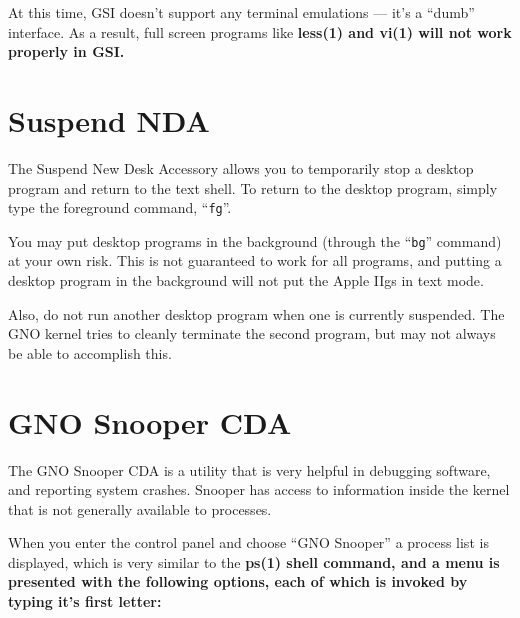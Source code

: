 \documentclass{report}
\begin{document}
At this time, GSI doesn't support any
terminal emulations --- it's a ``dumb'' interface. As a result,
full screen programs like \bf less\rm(1) and \bf vi\rm(1) will not
work properly in GSI.

\section{Suspend NDA}

The Suspend New Desk Accessory allows you
to temporarily stop a desktop program and return to the text
shell. To return to the desktop program, simply type the foreground
command, ``\texttt{fg}''.

You may put desktop programs in the background
(through the ``\texttt{bg}'' command) 
at your own risk. This is not guaranteed to work for all programs,
and putting a desktop program in the background will not put the
Apple IIgs in text mode.

Also, do not run another desktop program
when one is currently suspended. The GNO kernel tries to cleanly
terminate the second program, but may not always be able to
accomplish this.

\section{GNO Snooper CDA}

The GNO Snooper CDA is a utility that is
very helpful in debugging software, and reporting system crashes.
Snooper has access to information inside the kernel that is not
generally available to processes.

When you enter the control panel and choose
``GNO Snooper'' a process list is displayed, which is
very similar to the \bf ps\rm(1) shell command, and a menu is presented
with the following options, each of which is invoked by typing it's
first letter:
\end{document}
